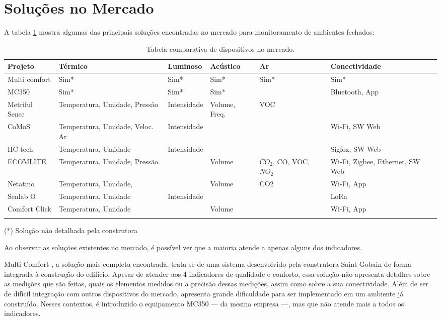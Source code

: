 \documentclass[../monografia.tex]{subfiles}
\begin{document}
\section{Soluções no Mercado} 

A tabela \ref{table:mercado} mostra algumas das principais soluções encontradas no mercado para monitoramento de ambientes fechados: 

\begin{center}
\begin{longtable}{ | m{2.5cm} | m{2.4cm}| m{2.2cm} |m{2cm} |m{2cm} |m{2.8cm} | } 
\hline
\textbf{Projeto} & \textbf{Térmico} & \textbf{Luminoso} & \textbf{Acústico} & \textbf{Ar} & \textbf{Conectividade} \\ 
\hline
Multi comfort \cite{multicomfort} & Sim* & Sim* & Sim* & Sim* & Sim* \\
\hline
MC350\cite{mc350} & Sim* & Sim* & Sim* & & Bluetooth, App \\
\hline
Metriful Sense\cite{metriful} & Temperatura, Umidade, Pressão & Intensidade & Volume, Freq. & VOC & \\
\hline
CoMoS\cite{CoMoS} & Temperatura, Umidade, Veloc. Ar & Intensidade & & & Wi-Fi, SW Web \\ 
\hline
HC tech\cite{HCTech} & Temperatura, Umidade & Intensidade & & & Sigfox, SW Web\\ 
\hline
ECOMLITE \cite{ECOMLITE} & Temperatura, Umidade, Pressão & & Volume & $CO_{2}$, CO, VOC, $NO_{2}$ & Wi-Fi, Zigbee, Ethernet, SW Web \\ 
\hline
Netatmo\cite{netatmo} & Temperatura, Umidade, & & Volume & CO2 & Wi-Fi, App\\ 
\hline
Senlab O\cite{Senlab} & Temperatura, Umidade & Intensidade & & & LoRa \\ \hline
Comfort Click\cite{comfortclick} & Temperatura, Umidade & & Volume & & Wi-Fi, App\\ 
\hline
\caption{Tabela comparativa de dispositivos no mercado.}
\label{table:mercado}
\end{longtable}
\end{center}

\begin{flushright}
(*) Solução não detalhada pela construtora
\end{flushright}

Ao observar as soluções existentes no mercado, é possível ver que a maioria atende a apenas alguns dos indicadores. 

Multi Comfort \cite{multicomfort}, a solução mais completa encontrada, trata-se de uma sistema desenvolvido pela construtora Saint-Gobain de forma integrada à construção do edifício. 
Apesar de atender aos 4 indicadores de qualidade e conforto, essa solução não apresenta detalhes sobre as medições que são feitas, quais os elementos medidos ou a precisão dessas medições, assim como sobre a sua conectividade. 
Além de ser de difícil integração com outros dispositivos do mercado, apresenta grande dificuldade para ser implementado em um ambiente já construído. Nesses contextos, é introduzido o equipamento MC350\cite{mc350} --- da mesma empresa ---, mas que não atende mais a todos os indicadores. 
\end{document}
